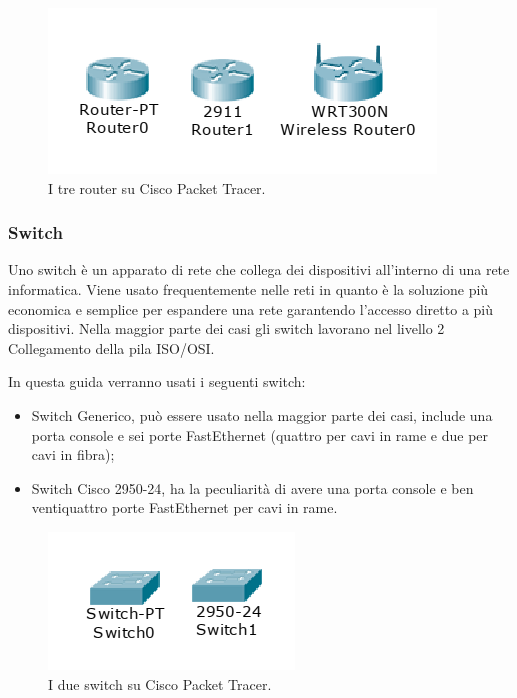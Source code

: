 \begin{figure}[htbp]
    \centering
    \includegraphics[scale=.5]{images/02.packet-tracer/router.png}
    \caption{I tre router su Cisco Packet Tracer.}
\end{figure}

\subsubsection{Switch}
Uno switch è un apparato di rete che collega dei dispositivi all'interno di una rete informatica. Viene usato frequentemente nelle reti in quanto è la soluzione più economica e semplice per espandere una rete garantendo l'accesso diretto a più dispositivi. Nella maggior parte dei casi gli switch lavorano nel livello 2 Collegamento della pila ISO/OSI.

\smallskip

\noindent In questa guida verranno usati i seguenti switch:

\begin{itemize}
    \item Switch Generico, può essere usato nella maggior parte dei casi, include una porta console e sei porte FastEthernet (quattro per cavi in rame e due per cavi in fibra);
    \item Switch Cisco 2950-24, ha la peculiarità di avere una porta console e ben ventiquattro porte FastEthernet per cavi in rame.
\end{itemize}

\begin{figure}[htbp]
    \centering
    \includegraphics[scale=.5]{images/02.packet-tracer/switch.png}
    \caption{I due switch su Cisco Packet Tracer.}
\end{figure}

